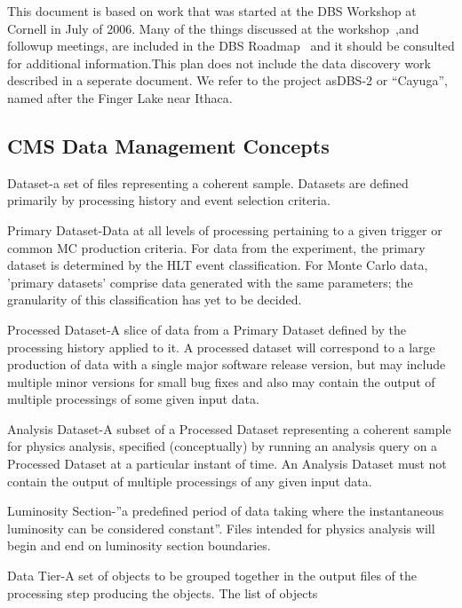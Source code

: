 \documentclass{cmspaper}
\begin{document}
This document is based on work that was started at the DBS Workshop at Cornell in July of 2006. Many of the things discussed at the workshop~\cite{dbs-workshop},and followup meetings, are included in the DBS Roadmap~\cite{dbs-roadmap} and it should be consulted for additional information.This plan does not include the data discovery work described in a seperate document. We refer to the project asDBS-2 or ``Cayuga'', named after the Finger Lake near Ithaca. 

\subsection{CMS Data Management Concepts}

\begin{description}
\item{Dataset}-a set of files representing a coherent sample.  Datasets are
defined primarily by processing history and event selection criteria.
\item{Primary Dataset}-Data at all levels of processing pertaining to a given
trigger or common MC production criteria.  For data from the experiment, the
primary dataset is determined by the HLT event classification.
For Monte Carlo data, 'primary datasets' comprise
data generated with the same parameters; the granularity of this
classification has yet to be decided.
\item{Processed Dataset}-A slice of data from a Primary Dataset defined by the
processing history applied to it.  A processed dataset
will correspond to a large production of data with a
single major software release version, but may include
multiple minor versions for small bug fixes and also
may contain the output of multiple processings of
some given input data.
\item{Analysis Dataset}-A subset of a Processed Dataset representing a
coherent sample for physics analysis, 
specified (conceptually) by running an analysis query on a Processed Dataset at
a particular instant of time.  An Analysis Dataset must not contain
the output of multiple processings of any given input data.
\item{Luminosity Section}-''a predefined period of data taking where the
instantaneous luminosity can be considered constant''.  Files intended
for physics analysis will begin and end on luminosity section boundaries.
\item{Data Tier}-A set of objects to be grouped together in the output
files of the processing step producing the objects.  The list of objects

\end{description}
\end{document}
